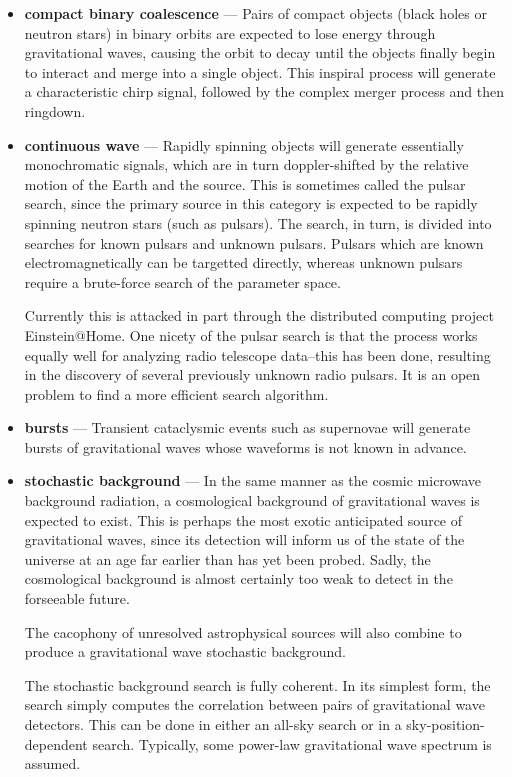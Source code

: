 \begin{itemize}

\item \textbf{compact binary coalescence} --- Pairs of compact objects
  (black holes or neutron stars) in binary orbits are expected to lose
  energy through gravitational waves, causing the orbit to decay until
  the objects finally begin to interact and merge into a single
  object.  This inspiral process will generate a characteristic chirp
  signal, followed by the complex merger process and then ringdown.

\item \textbf{continuous wave} --- Rapidly spinning objects will
  generate essentially monochromatic signals, which are in turn
  doppler-shifted by the relative motion of the Earth and the source.
  This is sometimes called the pulsar search, since the primary source
  in this category is expected to be rapidly spinning neutron stars
  (such as pulsars).  The search, in turn, is divided into searches
  for known pulsars and unknown pulsars.  Pulsars which are known
  electromagnetically can be targetted directly, whereas unknown
  pulsars require a brute-force search of the parameter space.

  Currently this is attacked in part through the distributed computing
  project Einstein@Home.  One nicety of the pulsar search is that the
  process works equally well for analyzing radio telescope data--this
  has been done, resulting in the discovery of several previously
  unknown radio pulsars\cite{Knispel2010Pulsar}.  It is an open
  problem to find a more efficient search algorithm.

\item \textbf{bursts} --- Transient cataclysmic events such as
  supernovae will generate bursts of gravitational waves whose
  waveforms is not known in advance.  

\item \textbf{stochastic background} --- In the same manner as the
  cosmic microwave background radiation, a cosmological background of
  gravitational waves is expected to exist.  This is perhaps the most
  exotic anticipated source of gravitational waves, since its
  detection will inform us of the state of the universe at an age far
  earlier than has yet been probed.  Sadly, the cosmological
  background is almost certainly too weak to detect in the forseeable
  future.

  The cacophony of unresolved astrophysical sources will also combine
  to produce a gravitational wave stochastic background.   

  The stochastic background search is fully coherent.  In its simplest
  form, the search simply computes the correlation between pairs of
  gravitational wave detectors.  This can be done in either an all-sky
  search or in a sky-position-dependent search.  Typically, some
  power-law gravitational wave spectrum is assumed.

\end{itemize}

